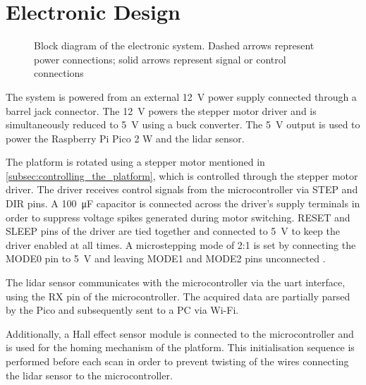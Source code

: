 \section{Electronic Design}
\begin{figure}[htbp]
\centering
    
\caption{Block diagram of the electronic system. Dashed arrows represent power connections; solid arrows represent signal or control connections}
\label{fig:electronics_block_diagram}

\end{figure}
The system is powered from an external \SI{12}{V} power supply connected through a barrel jack connector.
The \SI{12}{V} powers the stepper motor driver and is simultaneously reduced to \SI{5}{V} using a buck converter.
The \SI{5}{V} output is used to power the Raspberry Pi Pico 2 W and the \gls{lidar} sensor.

The platform is rotated using a stepper motor mentioned in \cref{subsec:controlling_the_platform}, which is controlled through the stepper motor driver. 
The driver receives control signals from the microcontroller via STEP and DIR pins. 
A \SI{100}{\micro\farad} capacitor is connected across the driver's supply terminals in order to suppress voltage spikes generated during motor switching.
RESET and SLEEP pins of the driver are tied together and connected to \SI{5}{V} to keep the driver enabled at all times.
A microstepping mode of 2:1 is set by connecting the MODE0 pin to \SI{5}{V} and leaving MODE1 and MODE2 pins unconnected \cite[sec.~8.3.5]{alldatasheet.com_DRV8825Download_}.

The \gls{lidar} sensor communicates with the microcontroller via the \gls{uart} interface, using the RX pin of the microcontroller. The acquired data are partially parsed by the Pico and subsequently sent to a PC via Wi-Fi.

Additionally, a Hall effect sensor module is connected to the microcontroller and is used for the homing mechanism of the platform.
This initialisation sequence is performed before each scan in order to prevent twisting of the wires connecting the \gls{lidar} sensor to the microcontroller.

